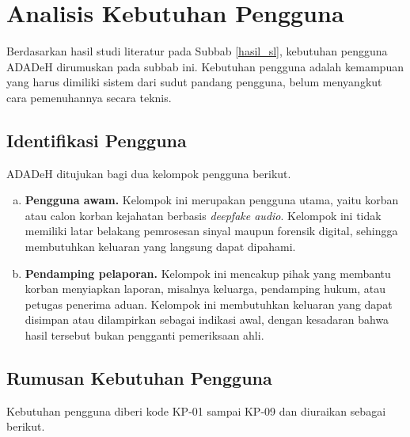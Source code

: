 \section{Analisis Kebutuhan Pengguna}
\label{keb_pengguna}

Berdasarkan hasil studi literatur pada Subbab \ref{hasil_sl}, kebutuhan pengguna ADADeH dirumuskan pada subbab ini. Kebutuhan pengguna adalah kemampuan yang harus dimiliki sistem dari sudut pandang pengguna, belum menyangkut cara pemenuhannya secara teknis.

\subsection{Identifikasi Pengguna}
\label{identifikasi_pengguna}

ADADeH ditujukan bagi dua kelompok pengguna berikut.
\begin{enumerate}[(a).]
  \item \textbf{Pengguna awam.} Kelompok ini merupakan pengguna utama, yaitu korban atau calon korban kejahatan berbasis \textit{deepfake audio}. Kelompok ini tidak memiliki latar belakang pemrosesan sinyal maupun forensik digital, sehingga membutuhkan keluaran yang langsung dapat dipahami.
  \item \textbf{Pendamping pelaporan.} Kelompok ini mencakup pihak yang membantu korban menyiapkan laporan, misalnya keluarga, pendamping hukum, atau petugas penerima aduan. Kelompok ini membutuhkan keluaran yang dapat disimpan atau dilampirkan sebagai indikasi awal, dengan kesadaran bahwa hasil tersebut bukan pengganti pemeriksaan ahli.
\end{enumerate}

\subsection{Rumusan Kebutuhan Pengguna}
\label{rumusan_kp}

Kebutuhan pengguna diberi kode KP-01 sampai KP-09 dan diuraikan sebagai berikut.

